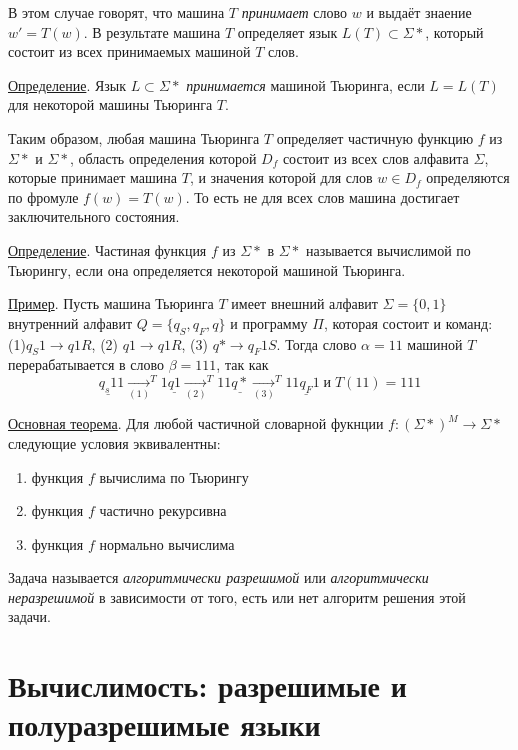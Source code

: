 \documentclass{article}
\begin{document}
В этом случае говорят, что машина $T$ \textit{принимает} слово $w$ и выдаёт знаение $w'=T(w)$. В результате машина $T$ определяет язык $L(T) \subset \Sigma*$, который состоит из всех принимаемых машиной $T$ слов.

\underline{Определение}. Язык $L \subset \Sigma*$ \textit{принимается} машиной Тьюринга, если $L = L(T)$ для некоторой машины Тьюринга $T$.

Таким образом, любая машина Тьюринга $T$ определяет частичную функцию $f$ из $\Sigma*$ и $\Sigma*$, область определения которой $D_f$ состоит из всех слов алфавита $\Sigma$, которые принимает машина $T$, и значения которой для слов $w \in D_f$ определяются по фромуле $f(w) = T(w)$. То есть не для всех слов машина достигает заключительного состояния.

\underline{Определение}. Частиная функция $f$ из $\Sigma*$ в $\Sigma*$ называется вычислимой по Тьюрингу, если она определяется некоторой машиной Тьюринга.

\underline{Пример}. Пусть машина Тьюринга $T$ имеет внешний алфавит $\Sigma = \{0,1\}$ внутренний алфавит $Q = \{q_S, q_F, q\}$ и программу $\Pi$, которая состоит и команд: (1)$q_S1 \to q1R$, (2) $q1 \to q1R$, (3) $q *\to q_F1S$. Тогда слово $\alpha = 11$ машиной $T$ перерабатывается в слово $\beta = 111$, так как
\begin{equation}
    \underline{q_s1}1 \underset{(1)}\to^T 1\underline{q1} \underset{(2)}\to^T 11\underline{q*} \underset{(3)}\to^T 11\underline{q_F}1 \; \text{и} \; T(11) = 111
\end{equation}

\underline{Основная теорема}. Для любой частичной словарной фукнции $f : (\Sigma*)^M \to \Sigma*$ следующие условия эквивалентны:
\begin{enumerate}
    \item функция $f$ вычислима по Тьюрингу
    \item функция $f$ частично рекурсивна
    \item функция $f$ нормально вычислима
\end{enumerate}

Задача называется \textit{алгоритмически разрешимой} или \textit{алгоритмически неразрешимой} в зависимости от того, есть или нет алгоритм решения этой задачи.

\section{Вычислимость: разрешимые и полуразрешимые языки}
\end{document}
